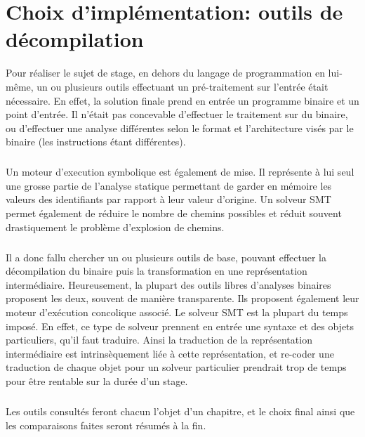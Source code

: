 \section{Choix d'implémentation: outils de décompilation}
Pour réaliser le sujet de stage, en dehors du langage de programmation en lui-même, un ou plusieurs outils effectuant
un pré-traitement sur l'entrée était nécessaire. En effet, la solution finale prend en entrée un programme binaire et un point
d'entrée. Il n'était pas concevable d'effectuer le traitement sur du binaire, ou d'effectuer une analyse différentes selon le format
et l'architecture visés par le binaire (les instructions étant différentes).
\subparagraph{}
Un moteur d'execution symbolique est également de mise. Il représente à lui seul une grosse partie de l'analyse statique permettant de
garder en mémoire les valeurs des identifiants par rapport à leur valeur d'origine. Un solveur SMT permet également de réduire le nombre
de chemins possibles et réduit souvent drastiquement le problème d'explosion de chemins.
\subparagraph{}
Il a donc fallu chercher un ou plusieurs outils de base, pouvant effectuer la décompilation du binaire puis la transformation en une
représentation intermédiaire. Heureusement, la plupart des outils libres d'analyses binaires proposent les deux, souvent de manière transparente.
Ils proposent également leur moteur d'exécution concolique associé. Le solveur SMT est la plupart du temps imposé. En effet, ce type de solveur prennent
en entrée une syntaxe et des objets particuliers, qu'il faut traduire. Ainsi la traduction de la représentation intermédiaire est intrinsèquement liée à cette
représentation, et re-coder une traduction de chaque objet pour un solveur particulier prendrait trop de temps pour être rentable sur la durée d'un stage.
\subparagraph{}
Les outils consultés feront chacun l'objet d'un chapitre, et le choix final ainsi que les comparaisons faites seront résumés à la fin.

